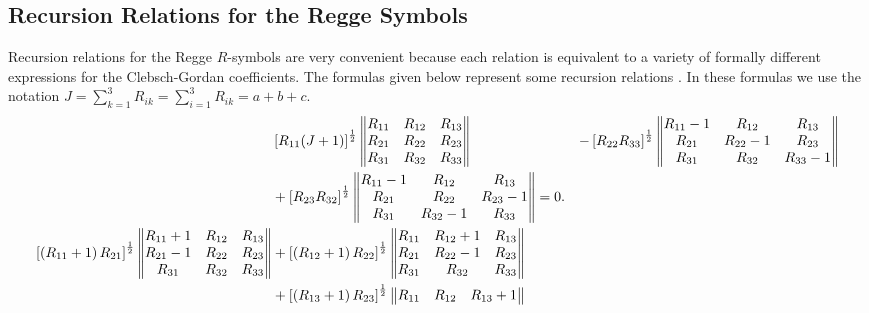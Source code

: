 \subsection{Recursion Relations for the Regge Symbols}\label{sec:8.6.8}
Recursion relations for the Regge $R$-symbols are very convenient because each relation is equivalent to a variety of formally different expressions for the Clebsch-Gordan coefficients. The formulas given below represent some recursion relations \cite{ref086,ref103}. In these formulas we use the notation $J=\sum_{k=1}^{3} R_{i k}=\sum_{i=1}^{3} R_{i k}=a+b+c$.
\begin{align}
&\left[R_{11}(J+1)\right]^{\frac{1}{2}}\begin{Vmatrix}
R_{11} & R_{12} & R_{13} \\
R_{21} & R_{22} & R_{23} \\
R_{31} & R_{32} & R_{33}
\end{Vmatrix}&-\left[R_{22} R_{33}\right]^{\frac{1}{2}}\begin{Vmatrix}
R_{11}-1 & R_{12} & R_{13} \\
R_{21} & R_{22}-1 & R_{23} \\
R_{31} & R_{32} & R_{33}-1
\end{Vmatrix}  \notag\\
& +\left[R_{23} R_{32}\right]^{\frac{1}{2}}\begin{Vmatrix}
R_{11}-1 & R_{12} & R_{13} \\
R_{21} & R_{22} & R_{23}-1 \\
R_{31} & R_{32}-1 & R_{33}
\end{Vmatrix}=0 . \label{eq:8:6:35}\\
 \left[\left(R_{11}+1\right) R_{21}\right]^{\frac{1}{2}}\begin{Vmatrix}
R_{11}+1 & R_{12} & R_{13} \\
R_{21}-1 & R_{22} & R_{23} \\
R_{31} & R_{32} & R_{33}
\end{Vmatrix}&+\left[\left(R_{12}+1\right) R_{22}\right]^{\frac{1}{2}}\begin{Vmatrix}
R_{11} & R_{12}+1 & R_{13} \\
R_{21} & R_{22}-1 & R_{23} \\
R_{31} & R_{32} & R_{33}
\end{Vmatrix}  \notag\\
& +\left[\left(R_{13}+1\right) R_{23}\right]^{\frac{1}{2}}\begin{Vmatrix}
R_{11} & R_{12} & R_{13}+1 \\

\end{Vmatrix}
\end{align}
